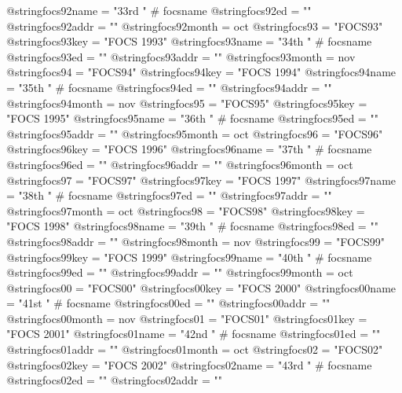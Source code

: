 @string{focs92name =            "33rd " # focsname}
@string{focs92ed =              ""}
@string{focs92addr =            ""}
@string{focs92month =           oct}
@string{focs93 =                "FOCS93"}
@string{focs93key =             "FOCS 1993"}
@string{focs93name =            "34th " # focsname}
@string{focs93ed =              ""}
@string{focs93addr =            ""}
@string{focs93month =           nov}
@string{focs94 =                "FOCS94"}
@string{focs94key =             "FOCS 1994"}
@string{focs94name =            "35th " # focsname}
@string{focs94ed =              ""}
@string{focs94addr =            ""}
@string{focs94month =           nov}
@string{focs95 =                "FOCS95"}
@string{focs95key =             "FOCS 1995"}
@string{focs95name =            "36th " # focsname}
@string{focs95ed =              ""}
@string{focs95addr =            ""}
@string{focs95month =           oct}
@string{focs96 =                "FOCS96"}
@string{focs96key =             "FOCS 1996"}
@string{focs96name =            "37th " # focsname}
@string{focs96ed =              ""}
@string{focs96addr =            ""}
@string{focs96month =           oct}
@string{focs97 =                "FOCS97"}
@string{focs97key =             "FOCS 1997"}
@string{focs97name =            "38th " # focsname}
@string{focs97ed =              ""}
@string{focs97addr =            ""}
@string{focs97month =           oct}
@string{focs98 =                "FOCS98"}
@string{focs98key =             "FOCS 1998"}
@string{focs98name =            "39th " # focsname}
@string{focs98ed =              ""}
@string{focs98addr =            ""}
@string{focs98month =           nov}
@string{focs99 =                "FOCS99"}
@string{focs99key =             "FOCS 1999"}
@string{focs99name =            "40th " # focsname}
@string{focs99ed =              ""}
@string{focs99addr =            ""}
@string{focs99month =           oct}
@string{focs00 =                "FOCS00"}
@string{focs00key =             "FOCS 2000"}
@string{focs00name =            "41st " # focsname}
@string{focs00ed =              ""}
@string{focs00addr =            ""}
@string{focs00month =           nov}
@string{focs01 =                "FOCS01"}
@string{focs01key =             "FOCS 2001"}
@string{focs01name =            "42nd " # focsname}
@string{focs01ed =              ""}
@string{focs01addr =            ""}
@string{focs01month =           oct}
@string{focs02 =                "FOCS02"}
@string{focs02key =             "FOCS 2002"}
@string{focs02name =            "43rd " # focsname}
@string{focs02ed =              ""}
@string{focs02addr =            ""}
